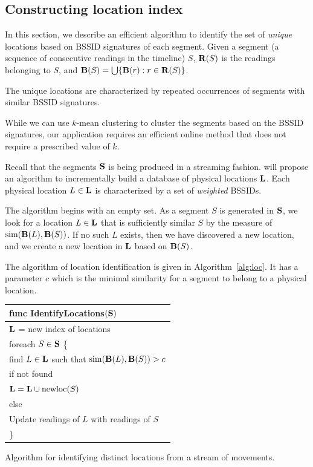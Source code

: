 \subsection{Constructing location index}

In this section, we describe an efficient algorithm to identify the set of {\em
unique} locations based on BSSID signatures of each segment.  Given a segment (a
sequence of consecutive readings in the timeline) $S$, $\mathbf{R}(S)$ is the readings
belonging to $S$, and $\mathbf{B}(S) = \bigcup\{\mathbf{B}(r): r\in\mathbf{R}(S)\}$.

The unique locations are characterized by repeated occurrences of segments with
similar BSSID signatures.

While we can use $k$-mean clustering to cluster the segments based on the BSSID
signatures, our application requires an efficient online method that does not
require a prescribed value of $k$.

Recall that the segments $\mathbf{S}$ is being produced in a streaming fashion.  will
propose an algorithm to incrementally build a database of physical locations
$\mathbf{L}$.  Each physical location $L\in\mathbf{L}$ is characterized by a set of {\em
weighted} BSSIDs.

The algorithm begins with an empty set.  As a segment $S$ is generated in $\mathbf{S}$, we
look for a location $L\in\mathbf{L}$ that is sufficiently similar $S$ by the measure
of $\mathrm{sim}(\mathbf{B}(L), \mathbf{B}(S))$.  If no such $L$ exists, then we have
discovered a new location, and we create a new location in $\mathbf{L}$ based on $\mathbf{B}(S)$.

The algorithm of location identification is given in Algorithm~\ref{alg:loc}.
It has a parameter $c$ which is the minimal similarity for a segment to belong
to a physical location.

\begin{algorithm}[h]
    \centering
\begin{tabular}{|l|} \hline
    func IdentifyLocations$(\mathbf{S})$ \\ \hline
    $\mathbf{L}$ = new index of locations \\
    foreach $S\in\mathbf{S}$ \{ \\
        \RRR find $L\in\mathbf{L}$ such that $\mathrm{sim}(\mathbf{B}(L), \mathbf{B}(S)) > c$ \\
        \RRR if not found \\
        \RRR \RRR $\mathbf{L} = \mathbf{L}\cup \mathrm{newloc}(S)$ \\
        \RRR else \\
        \RRR \RRR Update readings of $L$ with readings of $S$ \\
    \}\\ \hline
\end{tabular}
\vspace{0.4cm}
\caption{Algorithm for identifying distinct locations from a stream of
movements.}
\label{alg:loc}
\end{algorithm}

